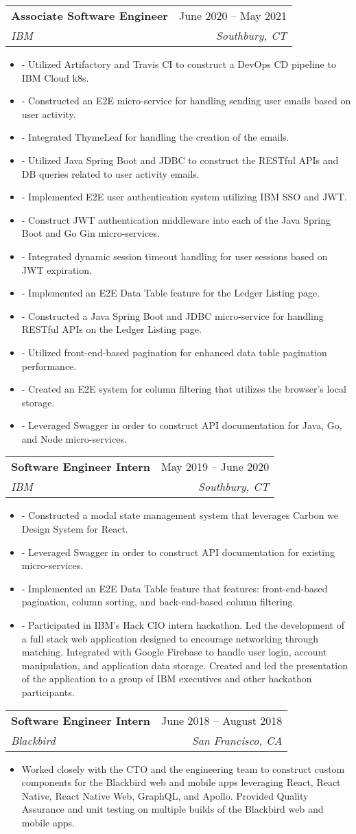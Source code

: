 \documentclass[letterpaper,11pt]{article}
\makeatletter
\newcommand{\resumeItem}[1]{
  \item[-] \small{
    {#1 \vspace{-2pt}}
  }
}
\newcommand{\resumeSubheading}[4]{
  \vspace{-2pt}\item
    \begin{tabular*}{0.97\textwidth}[t]{l@{\extracolsep{\fill}}r}
      \textbf{#1} & #2 \\
      \textit{\small#3} & \textit{\small #4} \\
    \end{tabular*}\vspace{-7pt}
}
\newcommand{\resumeItemListStart}{\begin{itemize}[rightmargin=\dimexpr\linewidth-17.25cm-\leftmargin\relax]}
\newcommand{\resumeItemListEnd}{\end{itemize}\vspace{-5pt}}
\makeatother
\begin{document}
\resumeSubheading
{Associate Software Engineer}{June 2020 – May 2021}
{IBM}{Southbury, CT}
\resumeItemListStart
\resumeItem{- Utilized Artifactory and Travis CI to construct a DevOps CD pipeline to IBM Cloud k8s.}
\resumeItem{- Constructed an E2E micro-service for handling sending user emails based on user activity.}
\resumeItem{- Integrated ThymeLeaf for handling the creation of the emails.}
\resumeItem{- Utilized Java Spring Boot and JDBC to construct the RESTful APIs and DB queries related to user activity emails.}
\resumeItem{- Implemented E2E user authentication system utilizing IBM SSO and JWT.}
\resumeItem{- Construct JWT authentication middleware into each of the Java Spring Boot and Go Gin micro-services.}
\resumeItem{- Integrated dynamic session timeout handling for user sessions based on JWT expiration.}
\resumeItem{- Implemented an E2E Data Table feature for the Ledger Listing page.}
\resumeItem{- Constructed a Java Spring Boot and JDBC micro-service for handling RESTful APIs on the Ledger Listing page.}
\resumeItem{- Utilized front-end-based pagination for enhanced data table pagination performance.}
\resumeItem{- Created an E2E system for column filtering that utilizes the browser's local storage.}
\resumeItem{- Leveraged Swagger in order to construct API documentation for Java, Go, and Node micro-services.}
\resumeItemListEnd

\resumeSubheading
{Software Engineer Intern}{May 2019 – June 2020}
{IBM}{Southbury, CT}
\resumeItemListStart
\resumeItem{- Constructed a modal state management system that leverages Carbon we Design System for React.}
\resumeItem{- Leveraged Swagger in order to construct API documentation for existing micro-services.}
\resumeItem{- Implemented an E2E Data Table feature that features: front-end-based pagination, column sorting, and back-end-based column filtering.}
\resumeItem{- Participated in IBM's Hack CIO intern hackathon. Led the development of a full stack web application designed to encourage networking through matching. Integrated with Google Firebase to handle user login, account manipulation, and application data storage. Created and led the presentation of the application to a group of IBM executives and other hackathon participants.}
\resumeItemListEnd

\resumeSubheading
{Software Engineer Intern}{June 2018 – August 2018}
{Blackbird}{San Francisco, CA}
\resumeItemListStart
\resumeItem{Worked closely with the CTO and the engineering team to construct custom components for the Blackbird web and mobile apps leveraging React, React Native, React Native Web, GraphQL, and Apollo. Provided Quality Assurance and unit testing on multiple builds of the Blackbird web and mobile apps.}
\resumeItemListEnd
\end{document}
